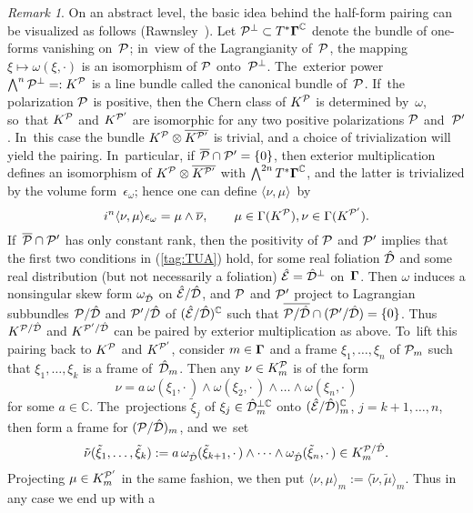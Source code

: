 \documentclass[11pt]{amsart}
\numberwithin{equation}{section}
\theoremstyle{remark}
\newtheorem{remark*}{Remark}
\newcommand\spr[2]{\langle #1,#2\rangle}
\newcommand\Omg{{\bigam}}   %
\newcommand\PP{{\Cal P}}
\newcommand\DD{{\Cal D}}
\newcommand\EE{{\Cal E}}
\newcommand\GG{{\PP'}}
\newcommand\hatDD{{\hat\DD}}
\newcommand\hatEE{\hat\EE}
\newcommand{\CC}{\C}
\newcommand{\bigam}{\mbox{\boldmath $\Gamma$}}
\newcommand{\C}{\mathbb C}
\begin{document}
\begin{remark*} On an abstract level, the basic idea behind  the half-form
pairing can be visualized as follows (Rawnsley~\cite{bib:RawnCMP}). Let
$\PP^\perp\subset T^*\Omg^\CC$ denote the bundle of one-forms vanishing
on~$\PP$; in~view of the Lagrangianity of~$\PP$, the mapping $\xi\mapsto\omega
(\xi,\cdot)$ is an isomorphism of $\PP$ onto~$\PP^\perp$. The~exterior power
$\bigwedge^n\PP^\perp=:K^\PP$ is a line bundle called the canonical bundle
of~$\PP$. If~the polarization $\PP$ is positive, then the Chern class of
$K^\PP$ is determined by~$\omega$, so~that $K^\PP$ and $K^\GG$ are isomorphic
for any two positive polarizations $\PP$ and~$\GG$. In~this case the bundle
$K^\PP\otimes\overline{K^\GG}$ is trivial, and a choice of trivialization will
yield the pairing. In~particular, if $\overline\PP\cap\GG=\{0\}$, then exterior
multiplication defines an isomorphism of $K^\PP\otimes\overline{K^\GG}$ with
$\bigwedge^{2n} T^*\Omg^\CC$, and the latter is trivialized by the volume
form~$\epsilon_\omega$; hence one can define $\spr\nu\mu$~by
$$ i^n \spr\nu\mu \epsilon_\omega = \mu\wedge\overline\nu, \qquad
\mu\in\Gamma(K^\PP), \nu\in\Gamma(K^\GG).  $$
If~$\overline\PP\cap\GG$ has only constant rank, then the positivity of $\PP$
and $\GG$ implies that the first two conditions in (\ref{tag:TUA}) hold, for
some real foliation $\hatDD$ and some real distribution (but not necessarily a
foliation) $\hatEE=\hatDD^\perp$ on~$\Omg$. Then $\omega$ induces a nonsingular
skew form $\omega_\hatDD$ on $\hatEE/\hatDD$, and $\PP$ and $\GG$ project to
Lagrangian subbundles $\PP/\hatDD$ and $\GG/\hatDD$ of $(\hatEE/\hatDD)^\CC$
such that $\overline{\PP/\hatDD}\cap(\GG/\hatDD)=\{0\}$. Thus $K^{\PP/\hatDD}$
and $K^{\GG/\hatDD}$ can be paired by exterior multiplication as above. To~lift
this pairing back to $K^\PP$ and $K^\GG$, consider $m\in \Omg$ and a frame
$\xi_1, \dots,\xi_n$ of $\PP_m$ such that $\xi_1,\dots,\xi_k$ is a frame
of~$\hatDD_m$. Then any $\nu\in K^\PP_m$ is of the form
$$ \nu = a\,\omega(\xi_1,\cdot\,)\wedge\omega(\xi_2,\cdot\,)\wedge\dots\wedge
\omega(\xi_n,\cdot\,)  $$
for some $a\in\CC$. The~projections $\tilde\xi_j$ of $\xi_j\in\hatDD_m^{\perp
\CC}$ onto $(\hatEE/\hatDD)_m^\CC$, $j=k+1,\dots,n$, then form a frame for
$(\PP/\hatDD)_m$, and we~set
$$ \tilde\nu(\tilde\xi_1,\dots,\tilde\xi_k) := a \,\omega_\hatDD(\tilde\xi
_{k+1},\cdot\,)\wedge \dots \wedge \omega_\hatDD(\tilde\xi_n,\cdot\,) \in
K_m^{\PP/\hatDD}.  $$
Projecting $\mu\in K^\GG_m$ in the same fashion, we then put $\spr\nu\mu_m:=
\spr{\tilde\nu}{\tilde\mu}_m$. Thus in any case we end up with a

\end{remark*}
\end{document}
